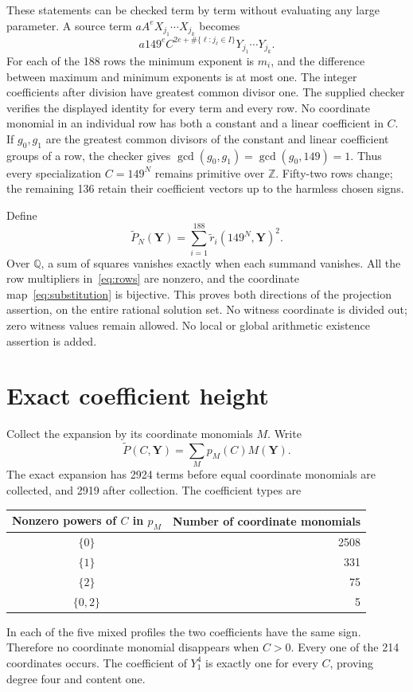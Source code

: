 \documentclass[11pt,a4paper]{article}
\newcommand{\Q}{\mathbb Q}\newcommand{\Z}{\mathbb Z}
\begin{document}
These statements can be checked term by term without evaluating any large
parameter. A source term $aA^eX_{j_1}\cdots X_{j_k}$ becomes
\[
 a149^e C^{2e+\#\{\ell:j_\ell\in I\}}
 Y_{j_1}\cdots Y_{j_k}.
\]
For each of the 188 rows the minimum exponent is $m_i$, and the difference
between maximum and minimum exponents is at most one. The integer
coefficients after division have greatest common divisor one. The supplied
checker verifies the displayed identity for every term and every row.
No coordinate monomial in an individual row has both a constant and a
linear coefficient in $C$. If $g_0,g_1$ are the greatest common divisors
of the constant and linear coefficient groups of a row, the checker gives
$\gcd(g_0,g_1)=\gcd(g_0,149)=1$. Thus every specialization $C=149^N$
remains primitive over $\Z$. Fifty-two rows change; the remaining 136
retain their coefficient vectors up to the harmless chosen signs.

Define
\[
 \widetilde P_N(\boldsymbol Y)=
 \sum_{i=1}^{188}\widetilde r_i(149^N,\boldsymbol Y)^2.
\]
Over $\Q$, a sum of squares vanishes exactly when each summand vanishes.
All the row multipliers in~\eqref{eq:rows} are nonzero, and the coordinate
map~\eqref{eq:substitution} is bijective. This proves both directions of
the projection assertion, on the entire rational solution set. No witness
coordinate is divided out; zero witness values remain allowed. No local
or global arithmetic existence assertion is added.

\section{Exact coefficient height}
Collect the expansion by its coordinate monomials $M$. Write
\[
 \widetilde P(C,\boldsymbol Y)=\sum_M p_M(C)M(\boldsymbol Y).
\]
The exact expansion has 2924 terms before equal coordinate monomials are
collected, and 2919 after collection. The coefficient types are
\begin{center}
\begin{tabular}{cr}
\toprule
Nonzero powers of $C$ in $p_M$ & Number of coordinate monomials\\\midrule
$\{0\}$&2508\\
$\{1\}$&331\\
$\{2\}$&75\\
$\{0,2\}$&5\\\bottomrule
\end{tabular}
\end{center}
In each of the five mixed profiles the two coefficients have the same
sign. Therefore no coordinate monomial disappears when $C>0$.
Every one of the 214 coordinates occurs. The coefficient of $Y_1^4$
is exactly one for every $C$, proving degree four and content one.
\end{document}
